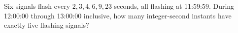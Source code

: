 Six signals flash every $2,3,4,6,9,23$ seconds, all flashing at 11:59:59. During 12:00:00 through 13:00:00 inclusive, how many integer-second instants have exactly five flashing signals?
